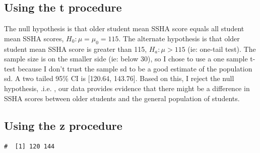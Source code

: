 \documentclass[letterpaper,11pt,twoside,]{pinp}
\begin{document}
\hypertarget{using-the-t-procedure}{%
\subsection{Using the t procedure}\label{using-the-t-procedure}}

The null hypothesis is that older student mean SSHA score equals all
student mean SSHA scores, \(H_0: \mu = \mu_0 = 115\). The alternate
hypothesis is that older student mean SSHA score is greater than 115,
\(H_a: \mu > 115\) (ie: one-tail test). The sample size is on the
smaller side (ie: below 30), so I chose to use a one sample t-test
because I don't trust the sample sd to be a good estimate of the
population sd. A two tailed 95\% CI is {[}120.64, 143.76{]}. Based on
this, I reject the null hypothesis, .i.e. , our data provides evidence
that there might be a difference in SSHA scores between older students
and the general population of students.

\hypertarget{using-the-z-procedure}{%
\subsection{Using the z procedure}\label{using-the-z-procedure}}

\begin{Shaded}
\begin{Highlighting}[]
\NormalTok{(} \NormalTok{(}\NormalTok{, }\NormalTok{), } \NormalTok{, } \SpecialCharTok{/}\NormalTok{(}\NormalTok{))}
\end{Highlighting}
\end{Shaded}

\begin{ShadedResult}
\begin{verbatim}
#  [1] 120 144
\end{verbatim}
\end{ShadedResult}

\begin{Shaded}
\begin{Highlighting}[]
 \SpecialCharTok{+} \NormalTok{(} \NormalTok{(}\NormalTok{, }\NormalTok{)) }\SpecialCharTok{*} \SpecialCharTok{/}\NormalTok{(}\NormalTok{)}
\end{Highlighting}
\end{Shaded}
\end{document}
